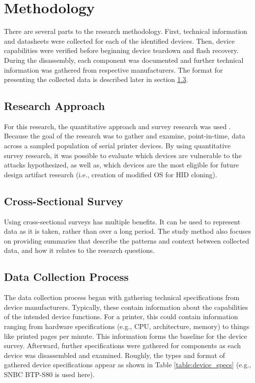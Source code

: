 \section{Methodology}

There are several parts to the research methodology. First, technical information and datasheets were collected for each of the identified devices. Then, device capabilities were verified before beginning device teardown and flash recovery. During the disassembly, each component was documented and further technical information was gathered from respective manufacturers. The format for presenting the collected data is described later in section \ref{datacollectionprocess}.

\subsection{Research Approach} \label{researchapproach}

For this research, the quantitative approach and survey research was used \autocite{babbie2017basics,creswell2017research}. Because the goal of the research was to gather and examine, point-in-time, data across a sampled population of serial printer devices. By using quantitative survey research, it was possible to evaluate which devices are vulnerable to the attacks hypothesized, as well as, which devices are the most eligible for future design artifact research (i.e., creation of modified OS for HID cloning).


\subsection{Cross-Sectional Survey} \label{casestudy}

Using cross-sectional surveys \autocite{creswell2017research} has multiple benefits. It can be used to represent data as it is taken, rather than over a long period.  The study method also focuses on providing summaries that describe the patterns and context between collected data, and how it relates to the research questions.


\subsection{Data Collection Process} \label{datacollectionprocess}

The data collection process began with gathering technical specifications from device manufacturers. Typically, these contain information about the capabilities of the intended device functions. For a printer, this could contain information ranging from hardware specifications (e.g., CPU, architecture, memory) to things like printed pages per minute. This information forms the baseline for the device survey. Afterward, further specifications were gathered for components as each device was disassembled and examined. Roughly, the types and format of gathered device specifications appear as shown in Table \ref{table:device_specs} (e.g., SNBC BTP-S80 is used here).

